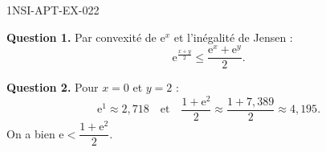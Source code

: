 \begin{corrige}{1NSI-APT-EX-022}

\textbf{Question 1.} Par convexité de $\mathrm{e}^x$ et l'inégalité de Jensen :
\[ \mathrm{e}^{\frac{x+y}{2}} \leq \frac{\mathrm{e}^x + \mathrm{e}^y}{2}. \]


\textbf{Question 2.} Pour $x=0$ et $y=2$ :
\[ \mathrm{e}^{1} \approx 2{,}718 \quad \text{et} \quad \frac{1 + \mathrm{e}^2}{2} \approx \frac{1 + 7{,}389}{2} \approx 4{,}195. \]
On a bien $\mathrm{e} < \dfrac{1 + \mathrm{e}^2}{2}$.

\end{corrige}
